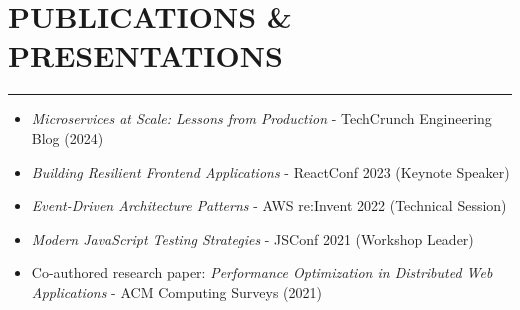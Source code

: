 \documentclass[a4paper,10pt]{article}           %
\begin{document}
    \section*{PUBLICATIONS \& PRESENTATIONS}
    \vspace{-0.5em}
    \hrule
    \vspace{0.3cm}
    \begin{itemize}[leftmargin=0.2cm, itemsep=0pt, label=--]
        \item \textit{Microservices at Scale: Lessons from Production} - TechCrunch Engineering Blog (2024)
        \item \textit{Building Resilient Frontend Applications} - ReactConf 2023 (Keynote Speaker)
        \item \textit{Event-Driven Architecture Patterns} - AWS re:Invent 2022 (Technical Session)
        \item \textit{Modern JavaScript Testing Strategies} - JSConf 2021 (Workshop Leader)
        \item Co-authored research paper: \textit{Performance Optimization in Distributed Web Applications} - ACM Computing Surveys (2021)
    \end{itemize}
\end{document}
